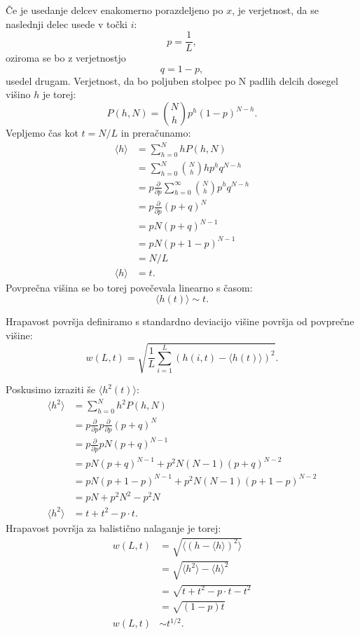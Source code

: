 \documentclass[a4paper, twoside, 12pt]{book}
\begin{document}
Če je usedanje delcev enakomerno porazdeljeno po $x$, je verjetnost, da se naslednji delec usede v točki $i$:
\begin{equation}
  p = \frac{1}{L},
\end{equation}
oziroma se bo z verjetnostjo
\begin{equation}
  q = 1 - p,
\end{equation}
usedel drugam.
Verjetnost, da bo poljuben stolpec po N padlih delcih dosegel višino $h$ je torej:
\begin{equation}
  P(h,N) = \binom{N}{h} p^h (1 - p)^{N - h}.
\end{equation}
Vepljemo čas kot $t = N / L$ in preračunamo:
\begin{align}
  \langle h \rangle &= \sum_{h=0}^{N} h P(h,N) \\
  &= \sum_{h=0}^{N} \binom{N}{h} h p^h q^{N - h} \\
  &= p \frac{\partial}{\partial p} \sum_{h=0}^{\infty} \binom{N}{h} p^h q^{N - h} \\
  &= p \frac{\partial}{\partial p} (p + q)^N \\
  &= p N (p + q)^{N-1} \\
  &= p N (p + 1 - p)^{N-1} \\
  &= N / L \\
  \langle h \rangle &= t.
\end{align}
Povprečna višina se bo torej povečevala linearno s časom:
\begin{equation}
  \langle h(t) \rangle \sim t.
\end{equation}

Hrapavost površja definiramo s standardno deviacijo višine površja od povprečne višine:
  \begin{equation}
    w(L,t) = \sqrt{\frac{1}{L} \sum_{i=1}^L (h(i,t)-\langle h(t) \rangle)^2}.
    \label{sirina-povrsine}
  \end{equation}

Poskusimo izraziti še $\langle h^2(t) \rangle $:
\begin{align}
  \langle h^2 \rangle &= \sum_{h=0}^{N} h^2 P(h,N) \\
  &= p \frac{\partial}{\partial p}p \frac{\partial}{\partial p} (p + q)^N \\
  &= p \frac{\partial}{\partial p} p N (p + q)^{N-1} \\
  &= p N (p + q)^{N-1} + p^2 N (N - 1) (p + q)^{N-2} \\
  &= p N (p + 1 - p)^{N-1} + p^2 N (N - 1) (p + 1 - p)^{N-2} \\
  &= p N + p^2 N^2 - p^2 N \\
  \langle h^2 \rangle &= t + t^2 - p \cdot t.
\end{align}
Hrapavost površja za balistično nalaganje je torej:
\begin{align}
  w(L,t) &= \sqrt{\langle (h - \langle h \rangle)^2\rangle} \\
  &= \sqrt{\langle h^2 \rangle - \langle h \rangle^2} \\
  &= \sqrt{t + t^2 - p \cdot t - t^2} \\
  &= \sqrt{(1-p)t} \\
  w(L,t) &\sim t^{1/2}.
\end{align}
\end{document}
